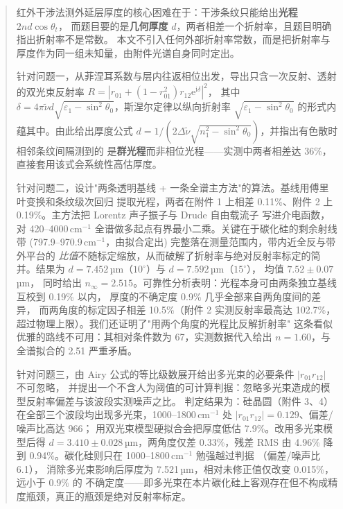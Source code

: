 \documentclass[12pt]{article}
\begin{document}

\begin{abstract}
红外干涉法测外延层厚度的核心困难在于：干涉条纹只能给出\textbf{光程} $2nd\cos\theta_t$，
而题目要的是\textbf{几何厚度} $d$，两者相差一个折射率，且题目明确指出折射率不是常数。
本文不引入任何外部折射率常数，而是把折射率与厚度作为同一组未知量，由附件光谱自身同时定出。

针对问题一，从菲涅耳系数与层内往返相位出发，导出只含一次反射、透射的双光束反射率
$R=\left|r_{01}+(1-r_{01}^{2})r_{12}\mathrm{e}^{\mathrm{i}\delta}\right|^{2}$，
其中 $\delta=4\pi\tilde\nu d\sqrt{\varepsilon_1-\sin^2\theta_0}$，斯涅尔定律以纵向折射率
$\sqrt{\varepsilon_1-\sin^2\theta_0}$ 的形式内蕴其中。由此给出厚度公式
$d=1/\left(2\Delta\tilde\nu\sqrt{n_1^2-\sin^2\theta_0}\right)$，并指出有色散时相邻条纹间隔测到的
是\textbf{群光程}而非相位光程——实测中两者相差达 36\%，
直接套用该式会系统性高估厚度。

针对问题二，设计"两条透明基线 + 一条全谱主方法"的算法。基线用傅里叶变换和条纹级次回归
提取光程，两者在附件 1 上相差 0.11\%、附件 2 上
0.19\%。主方法把 Lorentz 声子振子与 Drude 自由载流子
写进介电函数，对 420--4000\,cm$^{-1}$ 全谱做多起点有界最小二乘。关键在于碳化硅的剩余射线带
(797.9--970.9\,cm$^{-1}$，由拟合定出) 完整落在测量范围内，带内近全反与带外平台的
\emph{比值}不随标定缩放，从而破解了折射率与绝对反射率标定的简并。结果为
$d=7.452$\,µm（$10^\circ$）与 $d=7.592$\,µm（$15^\circ$），
均值 $\mathbf{7.52\pm0.07}$\,µm，
同时给出 $n_\infty=2.515$。可靠性分析表明：光程本身可由两条独立基线互校到 0.19\% 以内，
厚度的不确定度 0.9\% 几乎全部来自两角度间的差异，
而两角度的标定因子相差 10.5\%（附件 2 实测反射率最高达
102.7\%，超过物理上限）。我们还证明了"用两个角度的光程比反解折射率"
这条看似优雅的路线不可用：其相对条件数为 67，实测数据代入给出
$n=1.60$，与全谱拟合的 2.51 严重矛盾。

针对问题三，由 Airy 公式的等比级数展开给出多光束的必要条件 $|r_{01}r_{12}|$ 不可忽略，
并提出一个不含人为阈值的可计算判据：忽略多光束造成的模型反射率偏差与该波段实测噪声之比。
判定结果为：硅晶圆（附件 3、4）在全部三个波段均出现多光束，1000--1800\,cm$^{-1}$ 处
$|r_{01}r_{12}|=0.129$、偏差/噪声比高达 966；
用双光束模型硬拟合会把厚度低估 7.9\%。改用多光束模型后得
$d=\mathbf{3.410\pm0.028}$\,µm，两角度仅差
0.33\%，残差 RMS 由 4.96\% 降到
0.94\%。碳化硅则只在 1000--1800\,cm$^{-1}$ 勉强越过判据
（偏差/噪声比 6.1），
消除多光束影响后厚度为 7.521\,µm，相对未修正值仅改变
0.015\%，远小于 0.9\% 的
不确定度——即多光束在本片碳化硅上客观存在但不构成精度瓶颈，真正的瓶颈是绝对反射率标定。
\end{abstract}
\end{document}
